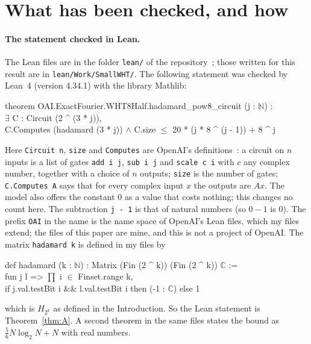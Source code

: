 \documentclass[10pt]{article}
\theoremstyle{remark}
\renewcommand{\lg}{\log_2}
\begin{document}
\section{What has been checked, and how}\label{sec:checked}

\paragraph{The statement checked in Lean.}
The Lean files are in the folder \verb|lean/| of the repository~\cite{Repo}; those written for this result
are in \verb|lean/Work/SmallWHT/|. The following statement was checked by Lean~4 (version 4.34.1) with the
library Mathlib:
\begin{flushleft}\ttfamily\small
theorem OAI.ExactFourier.WHT8Half.hadamard\_pow8\_circuit (j : $\mathbb{N}$) :\\
\hspace*{2em}$\exists$ C : Circuit (2 \textasciicircum{} (3 * j)),\\
\hspace*{3em}C.Computes (hadamard (3 * j)) $\wedge$ C.size $\le$ 20 * (j * 8 \textasciicircum{} (j - 1)) + 8 \textasciicircum{} j
\end{flushleft}
Here \verb|Circuit n|, \verb|size| and \verb|Computes| are OpenAI's
definitions~\cite{OAI1}: a circuit on $n$ inputs is a list of gates \verb|add i j|, \verb|sub i j| and
\verb|scale c i| with $c$ any complex number, together with a choice of $n$ outputs; \verb|size| is the number
of gates; \verb|C.Computes A| says that for every complex input $x$ the outputs are $Ax$. The model also offers the
constant $0$ as a value that costs nothing; this changes no count here. The subtraction
\verb|j - 1| is that of natural numbers (so $0-1$ is $0$). The prefix \verb|OAI| in the name is the name space
of OpenAI's Lean files, which my files extend; the files of this paper are mine, and this is not a project
of OpenAI. The matrix \verb|hadamard k| is defined in my files by
\begin{flushleft}\ttfamily\small
def hadamard (k : $\mathbb{N}$) : Matrix (Fin (2 \textasciicircum{} k)) (Fin (2 \textasciicircum{} k)) $\mathbb{C}$ :=\\
\hspace*{2em}fun j l => $\prod$ i $\in$ Finset.range k,\\
\hspace*{4em}if j.val.testBit i \&\& l.val.testBit i then (-1 : $\mathbb{C}$) else 1
\end{flushleft}
which is $H_{2^k}$ as defined in the Introduction. So the Lean statement is Theorem~\ref{thm:A}. A second
theorem in the same files states the bound as $\tfrac56N\lg N+N$ with real numbers.
\end{document}
